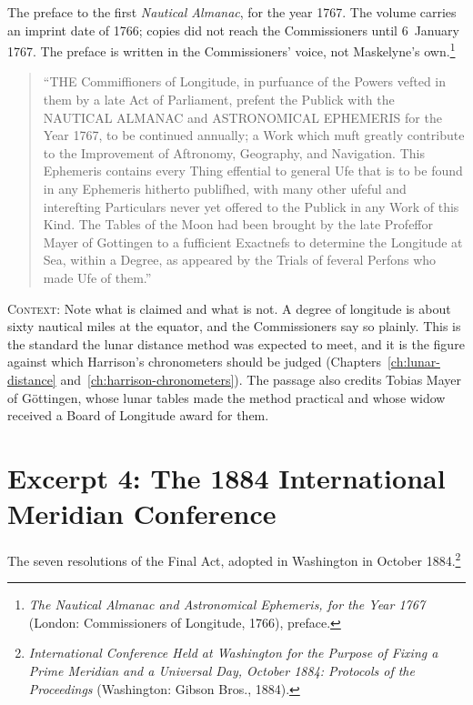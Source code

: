 The preface to the first \emph{Nautical Almanac}, for the year 1767. The volume carries an imprint date of 1766; copies did not reach the Commissioners until 6~January 1767. The preface is written in the Commissioners' voice, not Maskelyne's own.\footnote{\emph{The Nautical Almanac and Astronomical Ephemeris, for the Year 1767} (London: Commissioners of Longitude, 1766), preface.}

\begin{quote}
``THE Commiffioners of Longitude, in purfuance of the Powers vefted in them by a late Act of Parliament, prefent the Publick with the NAUTICAL ALMANAC and ASTRONOMICAL EPHEMERIS for the Year 1767, to be continued annually; a Work which muft greatly contribute to the Improvement of Aftronomy, Geography, and Navigation. This Ephemeris contains every Thing effential to general Ufe that is to be found in any Ephemeris hitherto publifhed, with many other ufeful and interefting Particulars never yet offered to the Publick in any Work of this Kind. The Tables of the Moon had been brought by the late Profeffor Mayer of Gottingen to a fufficient Exactnefs to determine the Longitude at Sea, within a Degree, as appeared by the Trials of feveral Perfons who made Ufe of them.''
\end{quote}

\noindent\textsc{Context}: Note what is claimed and what is not. A degree of longitude is about sixty nautical miles at the equator, and the Commissioners say so plainly. This is the standard the lunar distance method was expected to meet, and it is the figure against which Harrison's chronometers should be judged (Chapters~\ref{ch:lunar-distance} and~\ref{ch:harrison-chronometers}). The passage also credits Tobias Mayer of G\"ottingen, whose lunar tables made the method practical and whose widow received a Board of Longitude award for them.

\medskip

\section{Excerpt 4: The 1884 International Meridian Conference}

The seven resolutions of the Final Act, adopted in Washington in October 1884.\footnote{\emph{International Conference Held at Washington for the Purpose of Fixing a Prime Meridian and a Universal Day, October 1884: Protocols of the Proceedings} (Washington: Gibson Bros., 1884).}

